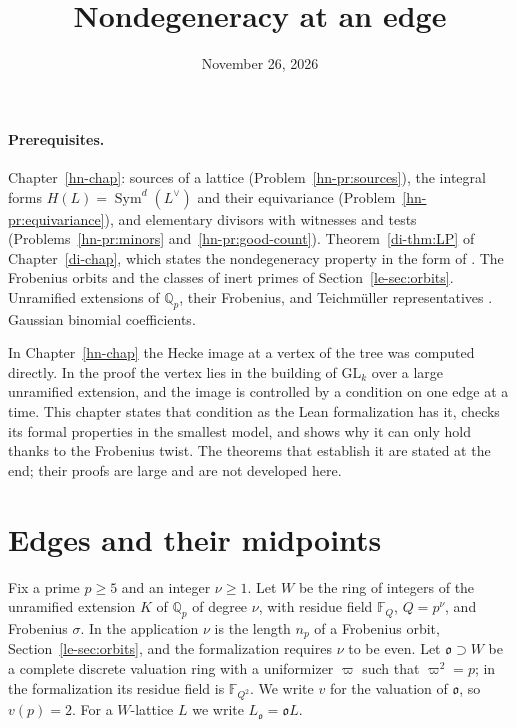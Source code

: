 \documentclass[reqno]{amsart}
\title{Nondegeneracy at an edge}
\author{}
\date{November 26, 2026}
\newcounter{chap}
\theoremstyle{definition}
\theoremstyle{plain}
\theoremstyle{remark}
\newcommand{\F}{\mathbb F}
\newcommand{\GL}{\mathrm{GL}}
\newcommand{\Sym}{\operatorname{Sym}}
\newcommand{\vo}{\mathfrak o}
\begin{document}
\maketitle
{}\label{chap}

\paragraph{Prerequisites.}
Chapter~\ref{hn-chap}: sources of a lattice (Problem~\ref{hn-pr:sources}), the integral forms \(H(L)=\Sym^d(L^\vee)\) and their equivariance (Problem~\ref{hn-pr:equivariance}), and elementary divisors with witnesses and tests (Problems~\ref{hn-pr:minors} and~\ref{hn-pr:good-count}).  Theorem~\ref{di-thm:LP} of Chapter~\ref{di-chap}, which states the nondegeneracy property in the form of \cite[Thm.~12.11]{Adr}.  The Frobenius orbits and the classes of inert primes of Section~\ref{le-sec:orbits}.  Unramified extensions of \(\mathbb Q_p\), their Frobenius, and Teichm\"uller representatives \cite[Ch.~II, \S\S4--5]{SeL}.  Gaussian binomial coefficients.

In Chapter~\ref{hn-chap} the Hecke image at a vertex of the tree was computed directly.  In the proof the vertex lies in the building of \(\GL_k\) over a large unramified extension, and the image is controlled by a condition on one edge at a time.  This chapter states that condition as the Lean formalization \cite{Lean} has it, checks its formal properties in the smallest model, and shows why it can only hold thanks to the Frobenius twist.  The theorems that establish it are stated at the end; their proofs are large and are not developed here.

\section{Edges and their midpoints}\label{sec:edges}

Fix a prime \(p\ge5\) and an integer \(\nu\ge1\).  Let \(W\) be the ring of integers of the unramified extension \(K\) of \(\mathbb Q_p\) of degree \(\nu\), with residue field \(\F_Q\), \(Q=p^\nu\), and Frobenius \(\sigma\).  In the application \(\nu\) is the length \(n_p\) of a Frobenius orbit, Section~\ref{le-sec:orbits}, and the formalization requires \(\nu\) to be even.  Let \(\vo\supset W\) be a complete discrete valuation ring with a uniformizer \(\varpi\) such that \(\varpi^2=p\); in the formalization its residue field is \(\F_{Q^2}\).  We write \(v\) for the valuation of \(\vo\), so \(v(p)=2\).  For a \(W\)-lattice \(L\) we write \(L_\vo=\vo L\).
\end{document}
